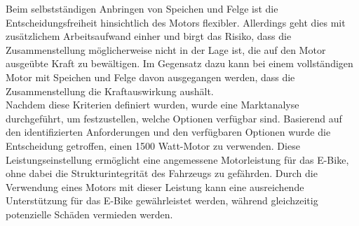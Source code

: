 Beim selbstständigen Anbringen von Speichen und Felge ist die Entscheidungsfreiheit hinsichtlich des Motors flexibler.
Allerdings geht dies mit zusätzlichem Arbeitsaufwand einher und birgt das Risiko, dass die Zusammenstellung möglicherweise nicht in der Lage ist, die auf den Motor ausgeübte Kraft zu bewältigen.
Im Gegensatz dazu kann bei einem vollständigen Motor mit Speichen und Felge davon ausgegangen werden, dass die Zusammenstellung die Kraftauswirkung aushält.\\

Nachdem diese Kriterien definiert wurden, wurde eine Marktanalyse durchgeführt, um festzustellen, welche Optionen verfügbar sind.
Basierend auf den identifizierten Anforderungen und den verfügbaren Optionen wurde die Entscheidung getroffen, einen 1500 Watt-Motor zu verwenden.
Diese Leistungseinstellung ermöglicht eine angemessene Motorleistung für das E-Bike, ohne dabei die Strukturintegrität des Fahrzeugs zu gefährden.
Durch die Verwendung eines Motors mit dieser Leistung kann eine ausreichende Unterstützung für das E-Bike gewährleistet werden, während gleichzeitig potenzielle Schäden vermieden werden.\\







